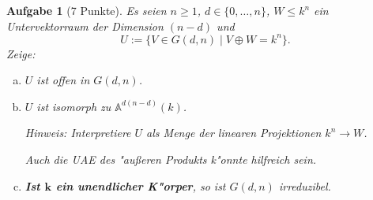 \documentclass[a4paper, 12pt, numbers=noendperiod, chapterprefix=true]{scrbook}
\theoremstyle{break}
\newtheorem{Aufg}{Aufgabe}
\theoremstyle{nonumberbreak}
\theoremstyle{nonumberplain}
\newcommand{\A}{\mathbb{A}}
\newcommand{\Affine}{\mathbb{A}} %
\begin{document}
\begin{Aufg}[7 Punkte]
Es seien $n \geq 1$, $d \in \{0,\dots, n\}$, $W \leq k^n$ ein Untervektorraum der Dimension $(n-d)$ und
	\[U := \{V \in G(d,n) \mid V \oplus W = k^n \}.\]
\emph{Zeige}:
\begin{enumerate}[a)]
	\item $U$ ist offen in $G(d,n)$.
	\item $U$ ist isomorph zu $\Affine^{d(n-d)}(k)$.
	
	\textit{Hinweis:} Interpretiere $U$ als Menge der linearen Projektionen $k^n \rightarrow W$.
	
	Auch die UAE des "au\ss eren Produkts k"onnte hilfreich sein.

	\item \textbf{Ist $\mathbf{k}$ ein unendlicher K"orper}, so ist $G(d,n)$ irreduzibel.
\end{enumerate}\end{Aufg}
\end{document}
